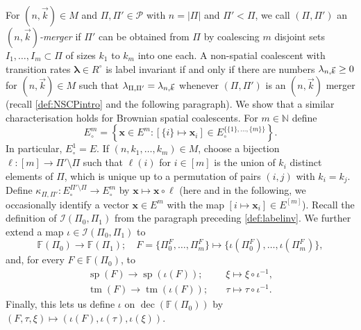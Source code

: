 \documentclass[reqno,draft]{amsart}
\numberwithin{equation}{section}
\theoremstyle{plain}
\theoremstyle{remark}
\newcommand{\N}{\mathbb{N}} %
\newcommand{\fpart}{\Pi} %
\newcommand{\rates}{R^\circ} %
\newcommand{\mergers}{M}
\DeclareMathOperator{\dcb}{dec}
\DeclareMathOperator{\dct}{tm}
\DeclareMathOperator{\dcs}{sp}
\newcommand{\nkmap}{\kappa} %
\newcommand{\labelinv}{\mathcal{I}} %
\newcommand{\lank}{\lambda_{n,\smash{\vec{k}}}}
\begin{document}
For $(n,\vec{k}) \in \mergers$ and $\fpart,\fpart'\in \mathcal{P}$ with $n = |\fpart|$ and $\fpart' < \fpart$, we call $(\fpart,\fpart')$ an  \emph{$(n,\vec{k})$-merger} if $\fpart'$ can be obtained from $\fpart$ by coalescing $m$ disjoint sets $I_1, \ldots ,I_m \subset \fpart$ of sizes $k_1$ to $k_m$ into one each. A non-spatial coalescent with transition rates $\boldsymbol \lambda \in \rates$ is label invariant if and only if there are numbers $\lank \ge 0$ for $(n,\vec{k}) \in \mergers$ such that $\lambda_{\fpart,\fpart'} = \lank$ whenever $(\fpart,\fpart')$ is an $(n,\vec{k})$ merger (recall \cref{def:NSCPintro} and the following paragraph). We show that a similar characterisation holds for Brownian spatial coalescents. For $m\in \N$ define \[
    E^m_\circ = \left\{ \boldsymbol x \in E^m\colon \left[ \{i\} \mapsto \boldsymbol x_i \right] \in E^{\{\{1\}, \ldots ,\{m\}\}}_\circ   \right\} .
\] In particular, $E^1_\circ  = E$.
If $(n,k_1, \ldots ,k_m) \in \mergers$, choose a bijection $\ell \colon [m] \to \fpart'\setminus \fpart$ such that $\ell(i)$ for $i \in [m]$ is the union of $k_i$ distinct elements of $\fpart$, which is unique up to a permutation of pairs $(i,j)$ with $k_i = k_j$. Define $\kappa_{\fpart,\fpart'}\colon E^{\fpart'\setminus \fpart}_\circ \to E^m_\circ $ by $\boldsymbol x \mapsto \boldsymbol x \circ \ell$ (here and in the following, we occasionally identify a vector $\boldsymbol x \in E^m$ with the map $[i \mapsto \boldsymbol x_i] \in E^{[m]}$). Recall the definition of $\labelinv(\fpart_0,\fpart_1)$ from the paragraph preceding \cref{def:labelinv}. We further extend a map $\iota \in \labelinv(\fpart_0,\fpart_1)$ to
\[
    \mathbb{F}(\fpart_0) \to \mathbb{F}(\fpart_1); \quad F = \{\fpart_0^F, \ldots ,\fpart_m^F\} \mapsto \{\iota(\fpart_0^F), \ldots ,\iota(\fpart_m^F)\},
\] and, for every $F \in \mathbb{F}(\fpart_0)$, to
\begin{align*}
    \dcs(F) \to \dcs(\iota(F));& \quad \xi \mapsto \xi \circ \iota^{-1},\\
    \dct(F) \to \dct(\iota(F));& \quad \tau \mapsto \tau \circ \iota^{-1}.
\end{align*}
Finally, this lets us define $\iota$ on $\dcb(\mathbb{F}(\fpart_0))$ by $(F,\tau,\xi) \mapsto (\iota(F),\iota(\tau),\iota(\xi))$.

\end{document}
